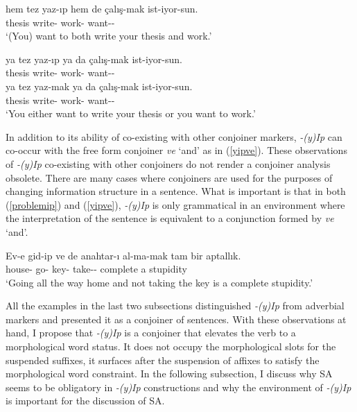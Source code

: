 \begin{exe}
\ex \label{problemip} 
\begin{xlist}
\ex \gll hem tez yaz-ıp hem de çalış-mak ist-iyor-sun. \\ 
{\Foc} thesis write-{\Pc} {\Foc} {\Ptcp} work-{\Nmlz} want-{\Prog}-{\Ssg} \\
\glt `(You) want to both write your thesis and work.'

\ex \gll *ya tez yaz-ıp ya da çalış-mak ist-iyor-sun. \\ 
{\Foc} thesis write-{\Pc} {\Foc} {\Ptcp} work-{\Nmlz} want-{\Prog}-{\Ssg} \\

\ex \gll ya tez yaz-mak ya da çalış-mak ist-iyor-sun. \\  
{\Foc} thesis write-{\Nmlz} {\Foc} {\Ptcp} work-{\Nmlz} want-{\Prog}-{\Ssg} \\
\glt `You either want to write your thesis or you want to work.'
\end{xlist}
\end{exe}


In addition to its ability of co-existing with other conjoiner markers, \textit{-(y)Ip} can co-occur with the free form conjoiner \textit{ve} `and' as in (\ref{yipve}). These observations of \textit{-(y)Ip} co-existing with other conjoiners do not render a conjoiner analysis obsolete. There are many cases where conjoiners are used for the purposes of changing information structure in a sentence. What is important is that in both (\ref{problemip}) and (\ref{yipve}), \textit{-(y)Ip} is only grammatical in an environment where the interpretation of the sentence is equivalent to a conjunction formed by \textit{ve} `and'.

\begin{exe}
    \ex \label{yipve}
    \gll Ev-e gid-ip ve de anahtar-ı al-ma-mak tam bir aptallık. \\ 
    house-{\Dat} go-{\Pc} {\And} {\Foc} key-{\Acc} take-{\Neg}-{\Nmlz} complete a stupidity \\
    \glt `Going all the way home and not taking the key is a complete stupidity.'
\end{exe}


All the examples in the last two subsections distinguished \textit{-(y)Ip} from adverbial markers and presented it as a conjoiner of sentences. With these observations at hand, I propose that \textit{-(y)Ip} is a conjoiner that elevates the verb to a morphological word status. It does not occupy the morphological slots for the suspended suffixes, it surfaces after the suspension of affixes to satisfy the morphological word constraint. In the following subsection, I discuss why SA seems to be obligatory in \textit{-(y)Ip} constructions and why the environment of \textit{-(y)Ip} is important for the discussion of SA.


